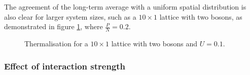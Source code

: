 \documentclass[prb, twocolumn, final]{revtex4-1}
\theoremstyle{plain}
\begin{document}
The agreement of the long-term average with a uniform spatial distribution is
also clear for larger system sizes, such as a $10\times1$ lattice with two
bosons, as demonstrated in figure \ref{10by1_U0.1}, where $\frac{P}{N} =0.2$.
\begin{figure}[H]
     \caption{Thermalisation for a $10\times 1$ lattice
     with two bosons and $U=0.1$.}
     \label{10by1_U0.1}
\end{figure}

\subsubsection{Effect of interaction strength
               \label{changing_interaction_strength}}
\end{document}

